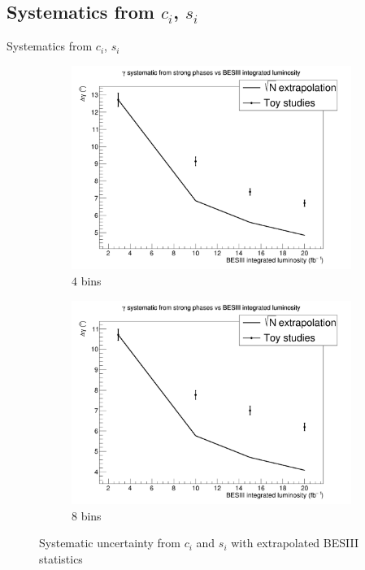 \documentclass{beamer}
\begin{document}
\subsection{Systematics from \texorpdfstring{$c_i$, $s_i$}{ci, si}}
\begin{frame}{Systematics from $c_i$, $s_i$}
  \begin{figure}
    \centering
    \vspace{-0.2cm}
    \begin{subfigure}{0.5\textwidth}
      \includegraphics[width = 1.0\textwidth]{cisi_Systematic_4Bins_Run2.png}
      \caption{$4$ bins}
    \end{subfigure}%
    \begin{subfigure}{0.5\textwidth}
      \includegraphics[width = 1.0\textwidth]{cisi_Systematic_8Bins_Run2.png}
      \caption{$8$ bins}
    \end{subfigure}
    \caption{Systematic uncertainty from $c_i$ and $s_i$ with extrapolated BESIII statistics}
  \end{figure}
\end{frame}
\end{document}
